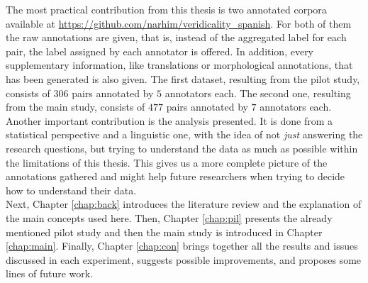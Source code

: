 The most practical contribution from this thesis is two annotated corpora available at \url{https://github.com/narhim/veridicality_spanish}. For both of them the raw annotations are given, that is, instead of the aggregated label for each pair, the label assigned by each annotator is offered. In addition, every supplementary information, like translations or morphological annotations, that has been generated is also given. The first dataset, resulting from the pilot study, consists of $306$ pairs annotated by $5$ annotators each. The second one, resulting from the main study, consists of $477$ pairs annotated by $7$ annotators each.\\

Another important contribution is the analysis presented. It is done from a statistical perspective and a linguistic one, with the idea of not \textit{just} answering the research questions, but trying to understand the data as much as possible within the limitations of this thesis. This gives us a more complete picture of the annotations gathered and might help future researchers when trying to decide how to understand their data.\\ 

Next, Chapter \ref{chap:back} introduces the literature review and the explanation of the main concepts used here. Then, Chapter \ref{chap:pil} presents the already mentioned pilot study and then the main study is introduced in Chapter \ref{chap:main}. Finally, Chapter \ref{chap:con} brings together all the results and issues discussed in each experiment, suggests possible improvements, and proposes some lines of future work.\\
